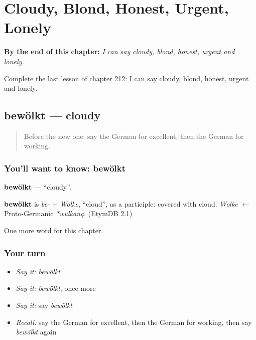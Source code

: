 
\chapter{Cloudy, Blond, Honest, Urgent, Lonely}
\label{ch:ge-cloudy-blond-honest-urgent-lonely}

\begin{chapteropening}
\textbf{By the end of this chapter:} \emph{I can say cloudy, blond, honest, urgent and lonely.}

Complete the last lesson of chapter 212: I can say cloudy, blond, honest, urgent and lonely.
\end{chapteropening}

\section[bewölkt]{bewölkt — cloudy}

\label{lesson:GE-C212-bewoelkt}



\begin{quote}
Before the new one: say the German for excellent, then the German for working.
\end{quote}

\subsection*{You'll want to know: bewölkt}
\textbf{bewölkt} — \textquotedblleft{}cloudy\textquotedblright{}.

\begin{cousinweb}
\textbf{bewölkt} is \emph{be-} + \emph{Wolke}, \textquotedblleft{}cloud\textquotedblright{}, as a participle: covered with cloud. \emph{Wolke} $\leftarrow$ Proto-Germanic \emph{*wulkaną}. (EtymDB 2.1)
\end{cousinweb}

\begin{grammarlens}[title={What you've built}]
One more word for this chapter.
\end{grammarlens}

\subsection*{Your turn}
\begin{itemize}
\raggedright
  \item \emph{Say it:} \emph{bewölkt}
  \item \emph{Say it:} \emph{bewölkt}, once more
  \item \emph{Say it:} say \emph{bewölkt}
  \item \emph{Recall:} say the German for excellent, then the German for working, then say \emph{bewölkt} again
\end{itemize}

